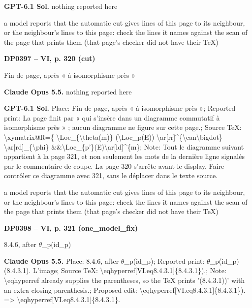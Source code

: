 \textbf{GPT-6.1 Sol.} nothing reported here\par
a model reports that the automatic cut gives lines of this page to its neighbour, or the neighbour's lines to this page: check the lines it names against the scan of the page that prints them (that page's checker did not have their TeX)\par
\par\noindent\hypertarget{DP0397}{}\textbf{DP0397 -- VI, p. 320 (cut)}\par
Fin de page, après « à isomorphisme près »\par
\textbf{Claude Opus 5.5.} nothing reported here\par
\textbf{GPT-6.1 Sol.} Place: Fin de page, après « à isomorphisme près »; Reported print: La page finit par « qui s'insère dans un diagramme commutatif à isomorphisme près » ; aucun diagramme ne figure sur cette page.; Source TeX: \textbackslash{}xymatrix@R=\allowbreak 1.5cm\{ \textbackslash{}Loc\_\{\textbackslash{}theta(m)\} (\textbackslash{}Loc\_p(E))  \textbackslash{}ar[rr]\textasciicircum{}\{\textbackslash{}can\textbackslash{}bigdot\} \textbackslash{}ar[rd]\_\{\textbackslash{}phi\}  \&\&\textbackslash{}Loc\_\{p'\}(E)\textbackslash{}ar[ld]\textasciicircum{}\{m\}; Note: Tout le diagramme suivant appartient à la page 321, et non seulement les mots de la dernière ligne signalés par le commentaire de coupe. La page 320 s'arrête avant le display. Faire contrôler ce diagramme avec 321, sans le déplacer dans le texte source.\par
a model reports that the automatic cut gives lines of this page to its neighbour, or the neighbour's lines to this page: check the lines it names against the scan of the page that prints them (that page's checker did not have their TeX)\par
\par\noindent\hypertarget{DP0398}{}\textbf{DP0398 -- VI, p. 321 (one\_model\_fix)}\par
8.4.6, after \ensuremath{\theta}\_p(id\_p)\par
\textbf{Claude Opus 5.5.} Place: 8.4.6, after \ensuremath{\theta}\_p(id\_p); Reported print: \ensuremath{\theta}\_p(id\_p) (8.4.3.1). L'image; Source TeX: \textbackslash{}eqhyperref[VI.eq8.4.3.1]\{8.4.3.1\}).; Note: \textbackslash{}eqhyperref already supplies the parentheses, so the TeX prints '(8.4.3.1))' with an extra closing parenthesis.; Proposed edit: \textbackslash{}eqhyperref[VI.eq8.4.3.1]\{8.4.3.1\}). =\allowbreak > \textbackslash{}eqhyperref[VI.eq8.4.3.1]\{8.4.3.1\}.\par
